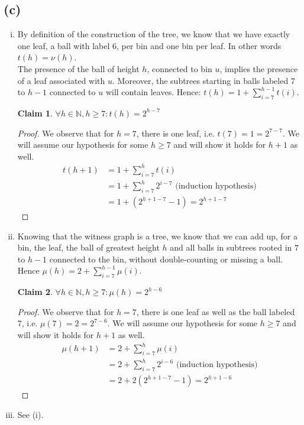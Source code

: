 \documentclass[a4paper,german]{article}
\newtheorem{claim}{Claim}
\begin{document}
\subsection*{(c)}
\begin{enumerate}[(i)]
	\item
	By definition of the construction of the tree, we know that we have exactly one leaf, a ball with label 6, per bin and one bin per leaf. In other words \(t(h) = \nu(h)\).  \\
	The presence of the ball of height \(h\), connected to bin \(u\), implies the presence of a leaf associated with \(u\). Moreover, the subtrees starting in balls labeled 7 to \(h-1\) connected to \(u\) will contain leaves. Hence: \(t(h) = 1 + \sum_{i=7}^{h-1} t(i) \).
	\begin{claim} 
		\(\forall h \in \mathbb{N}, h \geq 7: t(h) = 2^{h-7}\)
	\end{claim}
	\begin{proof} 
		We observe that for \(h = 7\), there is one leaf, i.e. \(t(7) = 1 = 2 ^{7-7}.\) We will assume our hypothesis for some \(h \geq 7\) and will show it holds for \(h+1\) as well.
		\begin{align*}
			t(h+1) &= 1 + \sum_{i=7}^{h} t(i) \\
			&= 1 + \sum_{i=7}^{h}2^{i-7} \text{ (induction hypothesis)} \\
			&= 1 + (2^{h+1-7} - 1) = 2^{h+1-7}
		\end{align*}
	\end{proof}
	\item
	Knowing that the witness graph is a tree, we know that we can add up, for a bin, the leaf, the ball of greatest height \(h\) and all balls in subtrees rooted in \(7\) to \(h-1\) connected to the bin, without double-counting or missing a ball. Hence \(\mu(h) = 2 + \sum_{i=7}^{h-1} \mu(i)\). 
	\begin{claim}
		\(\forall h \in \mathbb{N}, h \geq 7: \mu(h) = 2^{h-6}\)
	\end{claim}
	\begin{proof} 
		We observe that for \(h = 7\), there is one leaf as well as the ball labeled 7, i.e. \(\mu(7) = 2 = 2 ^{7-6}.\) We will assume our hypothesis for some \(h \geq 7\) and will show it holds for \(h+1\) as well.
		\begin{align*}
			\mu(h+1) &= 2 + \sum_{i=7}^{h} \mu(i) \\
			&= 2 + \sum_{i=7}^{h}2^{i-6} \text{ (induction hypothesis)} \\
			&= 2 + 2(2^{h+1-7} - 1) = 2^{h+1-6}
		\end{align*}
	\end{proof}


\item 
See (i).
\end{enumerate}
\end{document}

